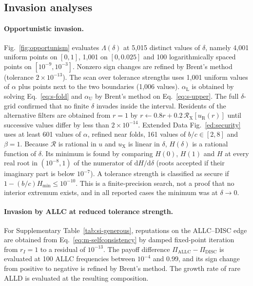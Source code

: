 \documentclass[10pt]{wlscirep}
\newcommand{\Rmap}{\mathscr{R}}            %
\newcommand{\uX}{u_{\mathrm{X}}}
\newcommand{\Hmin}{H_{\min}}
\newcommand{\dd}{\mathrm{d}}
\newcommand{\ALLC}{\mathrm{ALLC}}
\newcommand{\DISC}{\mathrm{DISC}}
\theoremstyle{plain}
\theoremstyle{remark}
\begin{document}
\subsection{Invasion analyses}

\paragraph{Opportunistic invasion.} Fig.~\ref{fig:opportunism} evaluates $\Lambda(\delta)$ at 5,015 distinct values of $\delta$, namely 4,001 uniform points on $[0,1]$, 1,001 on $[0,0.025]$ and 100 logarithmically spaced points on $[10^{-9},10^{-3}]$. Nonzero sign changes are refined by Brent's method (tolerance $2\times10^{-13}$). The scan over tolerance strengths uses 1,001 uniform values of $\alpha$ plus points next to the two boundaries (1,006 values). $\alpha_{\mathrm L}$ is obtained by solving Eq.~\eqref{eq:s-fold} and $\alpha_{\mathrm U}$ by Brent's method on Eq.~\eqref{eq:s-upper}. The full $\delta$-grid confirmed that no finite $\delta$ invades inside the interval. Residents of the alternative filters are obtained from $r=1$ by $r\leftarrow0.8r+0.2\,\Rmap_{\mathrm X}[u_{\mathrm R}(r)]$ until successive values differ by less than $2\times10^{-14}$. Extended Data Fig.~\ref{ed:security} uses at least 601 values of $\alpha$, refined near folds, 161 values of $b/c\in[2,8]$ and $\beta=1$. Because $\Rmap$ is rational in $u$ and $\uX$ is linear in $\delta$, $H(\delta)$ is a rational function of $\delta$. Its minimum is found by comparing $H(0)$, $H(1)$ and $H$ at every real root in $(10^{-8},1)$ of the numerator of $\dd H/\dd\delta$ (roots accepted if their imaginary part is below $10^{-7}$). A tolerance strength is classified as secure if $1-(b/c)\Hmin\leq10^{-10}$. This is a finite-precision search, not a proof that no interior extremum exists, and in all reported cases the minimum was at $\delta\to0$.

\paragraph{Invasion by ALLC at reduced tolerance strength.} For Supplementary Table~\ref{tab:si-generous}, reputations on the ALLC--DISC edge are obtained from Eq.~\eqref{eq:m-selfconsistency} by damped fixed-point iteration from $r_I=1$ to a residual of $10^{-13}$. The payoff difference $\Pi_{\ALLC}-\Pi_{\DISC}$ is evaluated at 100 ALLC frequencies between $10^{-4}$ and 0.99, and its sign change from positive to negative is refined by Brent's method. The growth rate of rare ALLD is evaluated at the resulting composition.
\end{document}
